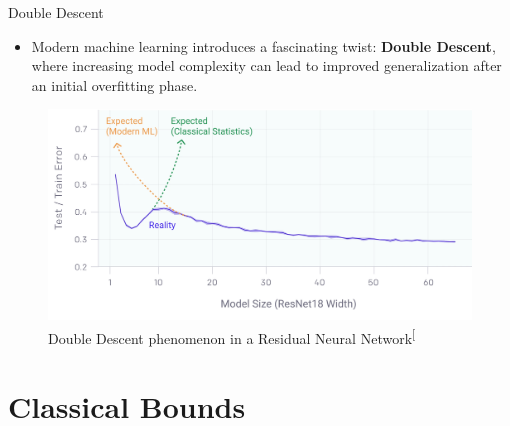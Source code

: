 \documentclass[
  ignorenonframetext,
]{beamer}
\providecommand{\tightlist}{%
  \setlength{\itemsep}{0pt}\setlength{\parskip}{0pt}}\usepackage{longtable,booktabs,array}
\begin{document}
\begin{frame}{Double Descent}
\label{double-descent}
\begin{itemize}
\tightlist
\item
  Modern machine learning introduces a fascinating twist: \textbf{Double
  Descent}, where increasing model complexity can lead to improved
  generalization after an initial overfitting phase.
\end{itemize}

\begin{figure}[H]

{\centering \includegraphics[width=0.8\linewidth,height=\textheight,keepaspectratio]{extra/double_descent.png}

}

\caption{Double Descent phenomenon in a Residual Neural
Network\textsuperscript{{[}\citeproc{ref-nakkiran19}{2}{]}}}

\end{figure}%
\end{frame}

\section{Classical Bounds}\label{classical-bounds}
\end{document}
